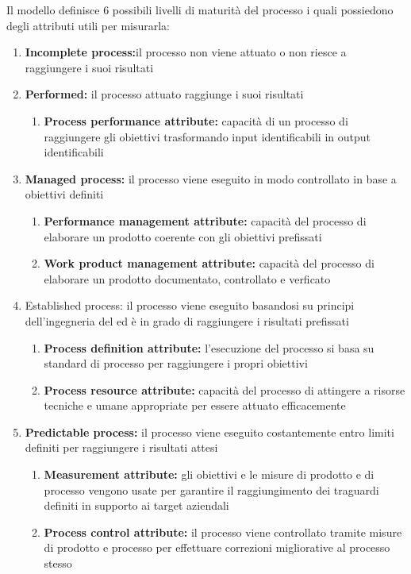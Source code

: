 \documentclass[12pt,a4paper]{article}
\begin{document}
Il modello  definisce 6 possibili livelli di maturità del processo i quali possiedono
degli attributi utili per misurarla:
\begin{enumerate}
	\item\textbf{Incomplete process:}il processo non viene attuato o non riesce a raggiungere i
	suoi risultati
	\item\textbf{Performed:} il processo attuato raggiunge i suoi risultati
	\begin{enumerate}
		\item\textbf{Process performance attribute:} capacità di un processo di raggiungere gli obiettivi trasformando input identificabili in output identificabili
	\end{enumerate}
	
	\item \textbf{Managed process:} il processo viene eseguito in modo controllato in base a obiettivi definiti
	\begin{enumerate}
		\item\textbf{Performance management attribute:} capacità del processo di elaborare
		un prodotto coerente con gli obiettivi prefissati
		\item\textbf{ Work product management attribute:} capacità del processo di elaborare un prodotto documentato, controllato e verficato
	\end{enumerate}
	\item{Established process:} il processo viene eseguito basandosi su principi dell'ingegneria
	del   ed è in grado di raggiungere i risultati prefissati
	\begin{enumerate}
		\item\textbf {Process definition attribute: } l'esecuzione del processo si basa su standard
		di processo per raggiungere i propri obiettivi
		\item \textbf{Process resource attribute: }capacità del processo di attingere a risorse
		tecniche e umane appropriate per essere attuato efficacemente
	\end{enumerate}
	\item\textbf{Predictable process:} il processo viene eseguito costantemente entro limiti definiti
	per raggiungere i risultati attesi
	\begin{enumerate}
		\item \textbf{ Measurement attribute:} gli obiettivi e le misure di prodotto e di processo vengono usate per garantire il raggiungimento dei traguardi definiti in
		supporto ai target aziendali
		\item\textbf{ Process control attribute:} il processo viene controllato tramite misure di prodotto e processo per effettuare correzioni migliorative al processo stesso
	\end{enumerate}
	

\end{enumerate}
\end{document}
